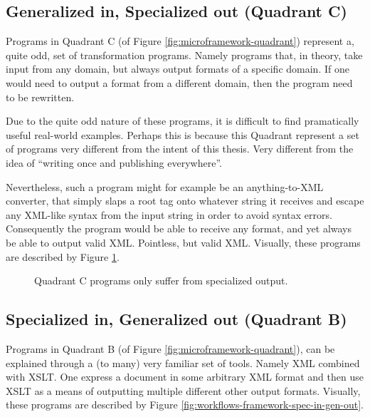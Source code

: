 \documentclass{scrreprt}
\begin{document}
\subsection{Generalized in, Specialized out (Quadrant C)}
Programs in Quadrant C (of Figure \ref{fig:microframework-quadrant}) represent a, quite odd, set of transformation programs. Namely programs that, in theory, take input from any domain, but always output formats of a specific domain. If one would need to output a format from a different domain, then the program need to be rewritten.

Due to the quite odd nature of these programs, it is difficult to find pramatically useful real-world examples. Perhaps this is because this Quadrant represent a set of programs very different from the intent of this thesis. Very different from the idea of ``writing once and publishing everywhere''.

Nevertheless, such a program might for example be an anything-to-XML converter, that simply slaps a root tag onto whatever string it receives and escape any XML-like syntax from the input string in order to avoid syntax errors. Consequently the program would be able to receive any format, and yet always be able to output valid XML. Pointless, but valid XML. Visually, these programs are described by Figure \ref{fig:workflows-framework-gen-in-spec-out}.

\begin{figure}[h]
  \centering


  \caption{Quadrant C programs only suffer from specialized output.}
  \label{fig:workflows-framework-gen-in-spec-out}
\end{figure}



\subsection{Specialized in, Generalized out (Quadrant B)}
Programs in Quadrant B (of Figure \ref{fig:microframework-quadrant}), can be explained through a (to many) very familiar set of tools. Namely XML combined with XSLT. One express a document in some arbitrary XML format and then use XSLT as a means of outputting multiple different other output formats. Visually, these programs are described by Figure \ref{fig:workflows-framework-spec-in-gen-out}.
\end{document}
